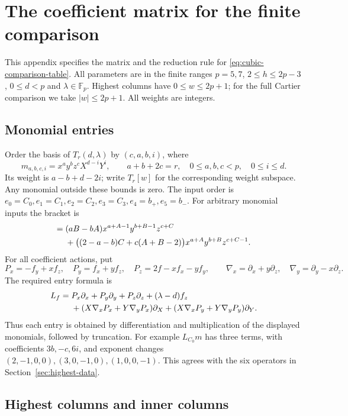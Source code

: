 \documentclass[11pt]{article}
\theoremstyle{plain}
\theoremstyle{definition}
\theoremstyle{remark}
\numberwithin{equation}{section}
\begin{document}
\appendix
\section{The coefficient matrix for the finite comparison}\label{app:comparison}

This appendix specifies the matrix and the reduction rule for
\eqref{eq:cubic-comparison-table}. All parameters are in the finite
ranges \(p=5,7\), \(2\le h\le2p-3\), \(0\le d<p\) and
\(\lambda\in\mathbb F_p\). Highest columns have \(0\le w\le2p+1\);
for the full Cartier comparison we take \(|w|\le2p+1\).
All weights are integers.

\subsection{Monomial entries}

Order the basis of \(T_r(d,\lambda)\) by \((c,a,b,i)\), where
\[
 m_{a,b,c,i}=x^ay^bz^cX^{d-i}Y^i,\qquad
 a+b+2c=r,\quad0\le a,b,c<p,\quad0\le i\le d.
\]
Its weight is \(a-b+d-2i\); write \(T_r[w]\) for the corresponding
weight subspace. Any monomial outside these bounds is zero.
The input order is
\(e_0=C_0,e_1=C_1,e_2=C_2,e_3=C_3,e_4=b_+,e_5=b_-\).
For arbitrary monomial inputs the bracket is
\begin{align}
 [x^ay^bz^c,x^Ay^Bz^C]
 ={}&(aB-bA)x^{a+A-1}y^{b+B-1}z^{c+C}\notag\\
 &+\bigl((2-a-b)C+c(A+B-2)\bigr)
                  x^{a+A}y^{b+B}z^{c+C-1}.
 \label{eq:comparison-monomial-bracket}
\end{align}
For all coefficient actions, put
\[
 P_x=-f_y+xf_z,\quad P_y=f_x+yf_z,\quad
 P_z=2f-xf_x-yf_y,
 \qquad \nabla_x=\partial_x+y\partial_z,\quad
 \nabla_y=\partial_y-x\partial_z.
\]
The required entry formula is
\begin{align}
 L_f={}&P_x\partial_x+P_y\partial_y+P_z\partial_z
       +(\lambda-d)f_z\notag\\
 &+(X\nabla_xP_x+Y\nabla_yP_x)\partial_X
  +(X\nabla_xP_y+Y\nabla_yP_y)\partial_Y.
 \label{eq:comparison-action}
\end{align}
Thus each entry is obtained by differentiation and multiplication
of the displayed monomials, followed by truncation. For example
\(L_{C_0}m\) has three terms, with coefficients
\(3b,-c,6i\), and exponent changes
\((2,-1,0,0),(3,0,-1,0),(1,0,0,-1)\).
This agrees with the six operators in
Section~\ref{sec:highest-data}.

\subsection{Highest columns and inner columns}
\end{document}
